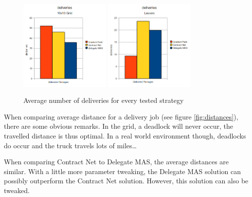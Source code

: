 \begin{figure}[H]
	\begin{center}
		\includegraphics[width=0.4\textwidth]{./figs/grid_deliveries.png}
		\quad
		\includegraphics[width=0.4\textwidth]{./figs/leuven_deliveries.png}
		\label{fig:deliveries}
		\caption{Average number of deliveries for every tested strategy}
	\end{center}
\end{figure}

\npar When comparing average distance for a delivery job (see figure
\ref{fig:distances}), there are some obvious remarks. In the grid, a
deadlock will never occur, the travelled distance is thus optimal. In a real
world environment though, deadlocks do occur and the truck travels lots of
miles\ldots

\npar When comparing Contract Net to Delegate MAS, the average distances are
similar. With a little more parameter tweaking, the Delegate MAS solution can
possibly outperform the Contract Net solution. However, this solution can also
be tweaked.

